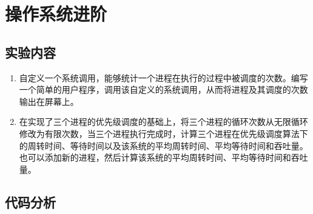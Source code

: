 \chapter{操作系统进阶}\label{cha:latex-brief-intro}

\section{实验内容}
\begin{enumerate}
    \item 自定义一个系统调用，能够统计一个进程在执行的过程中被调度的次数。编写一个简单的用户程序，调用该自定义的系统调用，从而将进程及其调度的次数输出在屏幕上。
    \item 在实现了三个进程的优先级调度的基础上，将三个进程的循环次数从无限循环修改为有限次数，当三个进程执行完成时，计算三个进程在优先级调度算法下的周转时间、等待时间以及该系统的平均周转时间、平均等待时间和吞吐量。也可以添加新的进程，然后计算该系统的平均周转时间、平均等待时间和吞吐量。
\end{enumerate}

\section{代码分析}

